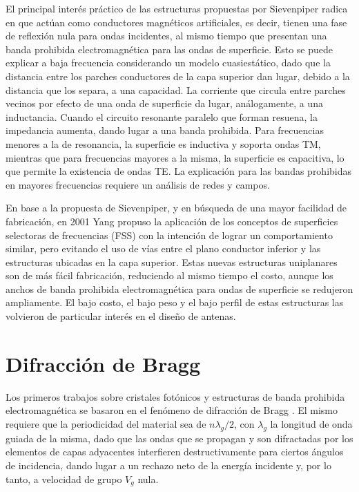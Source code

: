 El principal interés práctico de las estructuras propuestas por Sievenpiper radica en que actúan como conductores magnéticos artificiales, es decir, tienen una fase de reflexión nula para ondas incidentes, al mismo tiempo que presentan una banda prohibida electromagnética para las ondas de superficie. Esto se puede explicar a baja frecuencia considerando un modelo cuasiestático, dado que la distancia entre los parches conductores de la capa superior dan lugar, debido a la distancia que los separa, a una capacidad. La corriente que circula entre parches vecinos por efecto de una onda de superficie da lugar, análogamente, a una inductancia. Cuando el circuito resonante paralelo que forman resuena, la impedancia aumenta, dando lugar a una banda prohibida. Para frecuencias menores a la de resonancia, la superficie es inductiva y soporta ondas TM, mientras que para frecuencias mayores a la misma, la superficie es capacitiva, lo que permite la existencia de ondas TE. La explicación para las bandas prohibidas en mayores frecuencias requiere un análisis de redes y campos.

En base a la propuesta de Sievenpiper, y en búsqueda de una mayor facilidad de fabricación, en 2001 Yang propuso la aplicación de los conceptos de superficies selectoras de frecuencias (FSS) con la intención de lograr un comportamiento similar, pero evitando el uso de vías entre el plano conductor inferior y las estructuras ubicadas en la capa superior. Estas nuevas estructuras uniplanares son de más fácil fabricación, reduciendo al mismo tiempo el costo, aunque los anchos de banda prohibida electromagnética para ondas de superficie se redujeron ampliamente. El bajo costo, el bajo peso y el bajo perfil de estas estructuras las volvieron de particular interés en el diseño de antenas.


\section{Difracción de Bragg}
\label{sec_bragg}

Los primeros trabajos sobre cristales fotónicos y estructuras de banda prohibida electromagnética se basaron en el fenómeno de difracción de Bragg \cite{Caloz:ElectromagneticMetamaterials}. El mismo requiere que la periodicidad del material sea de $n\lambda_g/2$, con $\lambda_g$ la longitud de onda guiada de la misma, dado que las ondas que se propagan y son difractadas por los elementos de capas adyacentes interfieren destructivamente para ciertos ángulos de incidencia, dando lugar a un rechazo neto de la energía incidente y, por lo tanto, a velocidad de grupo $V_g$ nula.

